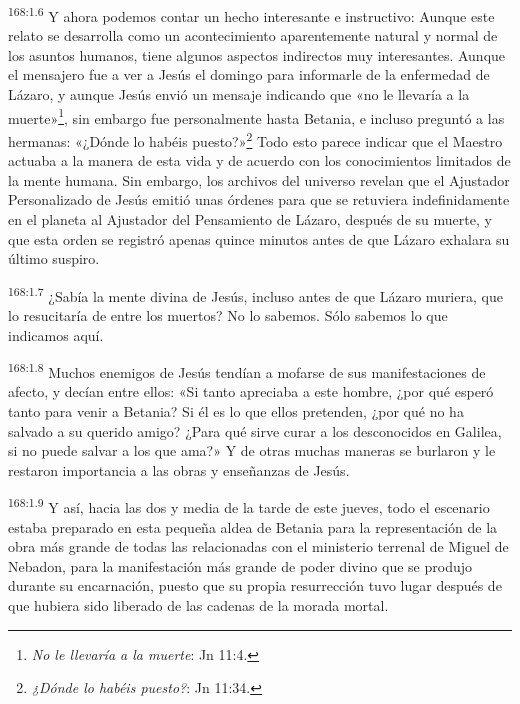 \par 
\textsuperscript{168:1.6} Y ahora podemos contar un hecho interesante e instructivo: Aunque este relato se desarrolla como un acontecimiento aparentemente natural y normal de los asuntos humanos, tiene algunos aspectos indirectos muy interesantes. Aunque el mensajero fue a ver a Jesús el domingo para informarle de la enfermedad de Lázaro, y aunque Jesús envió un mensaje indicando que «no le llevaría a la muerte»\footnote{\textit{No le llevaría a la muerte}: Jn 11:4.}, sin embargo fue personalmente hasta Betania, e incluso preguntó a las hermanas: «¿Dónde lo habéis puesto?»\footnote{\textit{¿Dónde lo habéis puesto?}: Jn 11:34.} Todo esto parece indicar que el Maestro actuaba a la manera de esta vida y de acuerdo con los conocimientos limitados de la mente humana. Sin embargo, los archivos del universo revelan que el Ajustador Personalizado de Jesús emitió unas órdenes para que se retuviera indefinidamente en el planeta al Ajustador del Pensamiento de Lázaro, después de su muerte, y que esta orden se registró apenas quince minutos antes de que Lázaro exhalara su último suspiro.

\par 
\textsuperscript{168:1.7} ¿Sabía la mente divina de Jesús, incluso antes de que Lázaro muriera, que lo resucitaría de entre los muertos? No lo sabemos. Sólo sabemos lo que indicamos aquí.

\par 
\textsuperscript{168:1.8} Muchos enemigos de Jesús tendían a mofarse de sus manifestaciones de afecto, y decían entre ellos: «Si tanto apreciaba a este hombre, ¿por qué esperó tanto para venir a Betania? Si él es lo que ellos pretenden, ¿por qué no ha salvado a su querido amigo? ¿Para qué sirve curar a los desconocidos en Galilea, si no puede salvar a los que ama?» Y de otras muchas maneras se burlaron y le restaron importancia a las obras y enseñanzas de Jesús.

\par 
\textsuperscript{168:1.9} Y así, hacia las dos y media de la tarde de este jueves, todo el escenario estaba preparado en esta pequeña aldea de Betania para la representación de la obra más grande de todas las relacionadas con el ministerio terrenal de Miguel de Nebadon, para la manifestación más grande de poder divino que se produjo durante su encarnación, puesto que su propia resurrección tuvo lugar después de que hubiera sido liberado de las cadenas de la morada mortal.

